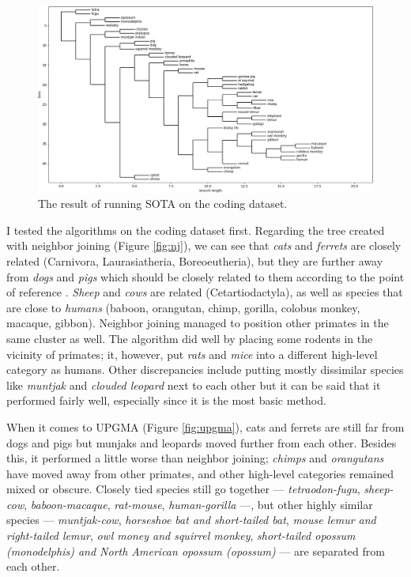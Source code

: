 \documentclass[11pt,twocolumn]{article}
\begin{document}
\begin{figure}
    \centering
    \includegraphics[width=\linewidth]{img/sota.png}
    \caption{The result of running SOTA on the coding dataset.}
    \label{fig:sota}
\end{figure}

I tested the algorithms on the coding dataset first. Regarding the tree created with neighbor joining (Figure \ref{fig:nj}), we can see that \textit{cats} and \textit{ferrets} are closely related (Carnivora, Laurasiatheria, Boreoeutheria), but they are further away from \textit{dogs} and \textit{pigs} which should be closely related to them according to the point of reference \cite{Prasad2008}. \textit{Sheep} and \textit{cows} are related (Cetartiodactyla), as well as species that are close to \textit{humans} (baboon, orangutan, chimp, gorilla, colobus monkey, macaque, gibbon). Neighbor joining managed to position other primates in the same cluster as well. The algorithm did well by placing some rodents in the vicinity of primates; it, however, put \textit{rats} and \textit{mice} into a different high-level category as humans. Other discrepancies include putting mostly dissimilar species like \textit{muntjak} and \textit{clouded leopard} next to each other but it can be said that it performed fairly well, especially since it is the most basic method.

When it comes to UPGMA (Figure \ref{fig:upgma}), cats and ferrets are still far from dogs and pigs but munjaks and leopards moved further from each other. Besides this, it performed a little worse than neighbor joining; \textit{chimps} and \textit{orangutans} have moved away from other primates, and other high-level categories remained mixed or obscure. Closely tied species still go together — \textit{tetraodon-fugu}, \textit{sheep-cow}, \textit{baboon-macaque}, \textit{rat-mouse}, \textit{human-gorilla} —, but other highly similar species — \textit{muntjak-cow}, \textit{horseshoe bat and short-tailed bat}, \textit{mouse lemur and right-tailed lemur}, \textit{owl money and squirrel monkey}, \textit{short-tailed opossum (monodelphis) and North American opossum (opossum)} — are separated from each other.
\end{document}
